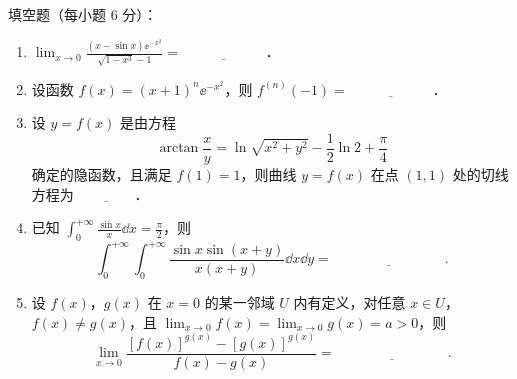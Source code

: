 
填空题（每小题 6 分）：
\begin{enumerate}[label=(\arabic*)]
  \item $\displaystyle \lim_{x\to 0}\frac{(x-\sin x)\ee^{-x^2}}{\sqrt{1-x^3}-1}=\underline{\hspace{6em}}$．
  \item 设函数 $f(x)=(x+1)^n\ee^{-x^2}$，则 $f^{(n)}(-1)=\underline{\hspace{6em}}$．
  \item 设 $y=f(x)$ 是由方程
  \[
    \arctan\frac{x}{y}=\ln\sqrt{x^2+y^2}-\frac{1}{2}\ln 2+\frac{\pi}{4}
  \]
  确定的隐函数，且满足 $f(1)=1$，则曲线 $y=f(x)$ 在点 $(1,1)$ 处的切线方程为 $\underline{\hspace{4em}}$．
  \item 已知 $\displaystyle \int_0^{+\infty}\frac{\sin x}{x}\dd x=\frac{\pi}{2}$，则
  \[
    \int_0^{+\infty}\int_0^{+\infty}\frac{\sin x\sin(x+y)}{x(x+y)}\dd x\dd y=\underline{\hspace{8em}}.
  \]
  \item 设 $f(x)$，$g(x)$ 在 $x=0$ 的某一邻域 $U$ 内有定义，对任意 $x\in U$，$f(x)\neq g(x)$，且 $\displaystyle \lim_{x\to 0}f(x)=\lim_{x\to 0}g(x)=a>0$，则
  \[
    \lim_{x\to 0}\frac{[f(x)]^{g(x)}-[g(x)]^{g(x)}}{f(x)-g(x)}=\underline{\hspace{8em}}.
  \]
\end{enumerate}
